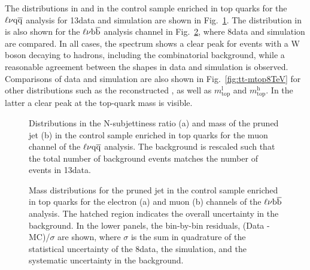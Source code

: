 The distributions in \mJ and \nsubj in the control sample enriched in top quarks for the $\ell\nu\mathrm{q}\overline{\mathrm{q}}$ analysis for 13\TeV data and simulation are shown in Fig.~\ref{fig:tt-controlPlots13TeV}.
The distribution in \mJ is also shown for the $\ell\nu{\mathrm{b}\overline{\mathrm{b}}}$ analysis channel in Fig.~\ref{fig:tt-controlPlots8TeV}, where 8\TeV data and simulation are compared.
In all cases, the \mJ spectrum shows a clear peak for events with a W boson decaying to hadrons, including the combinatorial background, while a reasonable agreement between the shapes in data and simulation is observed.
Comparisons of data and simulation are also shown in Fig.~\ref{fig:tt-mtop8TeV} for other distributions such as the reconstructed \mlvj, as well as $m_\mathrm{top}^\mathrm{l}$ and $m_\mathrm{top}^\mathrm{h}$.
In the latter a clear peak at the top-quark mass is visible.

\begin{figure}[!htb]
\centering
{}
\caption{Distributions in the N-subjettiness ratio \nsubj (a) and mass \mJ of the pruned jet (b) in the control sample enriched in top quarks for the muon channel of the $\ell\nu\mathrm{q}\overline{\mathrm{q}}$ analysis. The \ttbar background is rescaled such that the total number of background events matches the number of events in 13\TeV data.}
\label{fig:tt-controlPlots13TeV}
\end{figure}

\begin{figure}[!htb]
\centering
{}
\caption{Mass distributions for the pruned jet in the control sample enriched in top quarks for the electron (a) and muon (b) channels of the $\ell\nu{\mathrm{b}\overline{\mathrm{b}}}$ analysis. The hatched region indicates the overall uncertainty in the background. In the lower panels, the bin-by-bin residuals, (Data - MC)/$\sigma$ are shown, where $\sigma$ is the sum in quadrature of the statistical uncertainty of the 8\TeV data, the simulation, and the systematic uncertainty in the \ttbar background.}
\label{fig:tt-controlPlots8TeV}
\end{figure}


